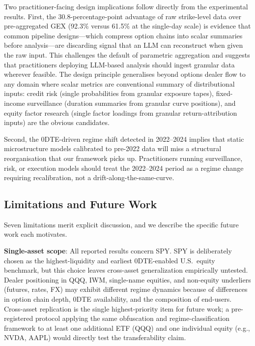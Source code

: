 Two practitioner-facing design implications follow directly from the
experimental results. First, the 30.8-percentage-point advantage of raw
strike-level data over pre-aggregated GEX (92.3\% versus 61.5\% at the
single-day scale) is evidence that common pipeline designs---which
compress option chains into scalar summaries before analysis---are
discarding signal that an LLM can reconstruct when given the raw input.
This challenges the default of parametric aggregation and suggests that
practitioners deploying LLM-based analysis should ingest granular data
wherever feasible. The design principle generalises beyond options
dealer flow to any domain where scalar metrics are conventional summary
of distributional inputs: credit risk (single probabilities from granular
exposure tapes), fixed-income surveillance (duration summaries from
granular curve positions), and equity factor research (single factor
loadings from granular return-attribution inputs) are the obvious
candidates.

Second, the 0DTE-driven regime shift detected in 2022--2024 implies
that static microstructure models calibrated to pre-2022 data will miss
a structural reorganisation that our framework picks up. Practitioners
running surveillance, risk, or execution models should treat the
2022--2024 period as a regime change requiring recalibration, not a
drift-along-the-same-curve.

\subsection{Limitations and Future Work}
\label{sec:limitations}

Seven limitations merit explicit discussion, and we describe the specific
future work each motivates.

\noindent\textbf{Single-asset scope}: All reported results concern SPY.
SPY is deliberately chosen as the highest-liquidity and earliest 0DTE-enabled
U.S.\ equity benchmark, but this choice leaves cross-asset generalization
empirically untested. Dealer positioning in QQQ, IWM, single-name equities,
and non-equity underliers (futures, rates, FX) may exhibit different
regime dynamics because of differences in option chain depth, 0DTE
availability, and the composition of end-users. Cross-asset replication is
the single highest-priority item for future work; a pre-registered protocol
applying the same obfuscation and regime-classification framework to at
least one additional ETF (QQQ) and one individual equity (e.g., NVDA, AAPL)
would directly test the transferability claim.


